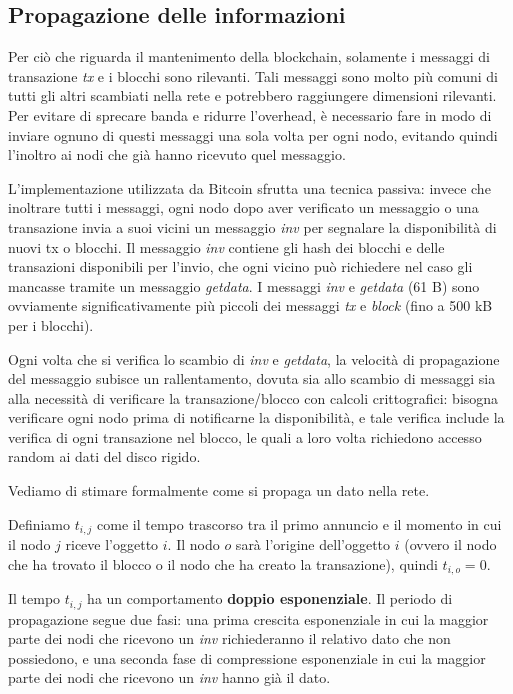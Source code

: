 \subsection{Propagazione delle informazioni}\label{propagazione-delle-informazioni}

Per ciò che riguarda il mantenimento della blockchain, solamente i messaggi di transazione \emph{tx} e i blocchi sono rilevanti. Tali messaggi sono molto più comuni di tutti gli altri scambiati nella rete e potrebbero raggiungere dimensioni rilevanti. Per evitare di sprecare banda e ridurre l'overhead, è necessario fare in modo di inviare ognuno di questi messaggi una sola volta per ogni nodo, evitando quindi l'inoltro ai nodi che già hanno ricevuto quel messaggio.

L'implementazione utilizzata da Bitcoin sfrutta una tecnica passiva: invece che inoltrare tutti i messaggi, ogni nodo dopo aver verificato un messaggio o una transazione invia a suoi vicini un messaggio \emph{inv} per segnalare la disponibilità di nuovi tx o blocchi. Il messaggio \emph{inv} contiene gli hash dei blocchi e delle transazioni disponibili per l'invio, che ogni vicino può richiedere nel caso gli mancasse tramite un messaggio \emph{getdata}. I messaggi \emph{inv} e \emph{getdata} (61 B) sono ovviamente significativamente più piccoli dei messaggi \emph{tx} e \emph{block} (fino a 500 kB per i blocchi).

Ogni volta che si verifica lo scambio di \emph{inv} e \emph{getdata}, la velocità di propagazione del messaggio subisce un rallentamento, dovuta sia allo scambio di messaggi sia alla necessità di verificare la transazione/blocco con calcoli crittografici: bisogna verificare ogni nodo prima di notificarne la disponibilità, e tale verifica include la verifica di ogni transazione nel blocco, le quali a loro volta richiedono accesso random ai dati del disco rigido.

Vediamo di stimare formalmente come si propaga un dato nella rete.

Definiamo $t_{i,j}$ come il tempo trascorso tra il primo annuncio e il momento in cui il nodo $j$ riceve l'oggetto $i$. Il nodo $o$ sarà l'origine dell'oggetto $i$ (ovvero il nodo che ha trovato il blocco o il nodo che ha creato la transazione), quindi $t_{i,o}=0$.

Il tempo $t_{i,j}$ ha un comportamento \textbf{doppio esponenziale}. Il periodo di propagazione segue due fasi: una prima crescita esponenziale in cui la maggior parte dei nodi che ricevono un \emph{inv} richiederanno il relativo dato che non possiedono, e una seconda fase di compressione esponenziale in cui la maggior parte dei nodi che ricevono un \emph{inv} hanno già il dato.

